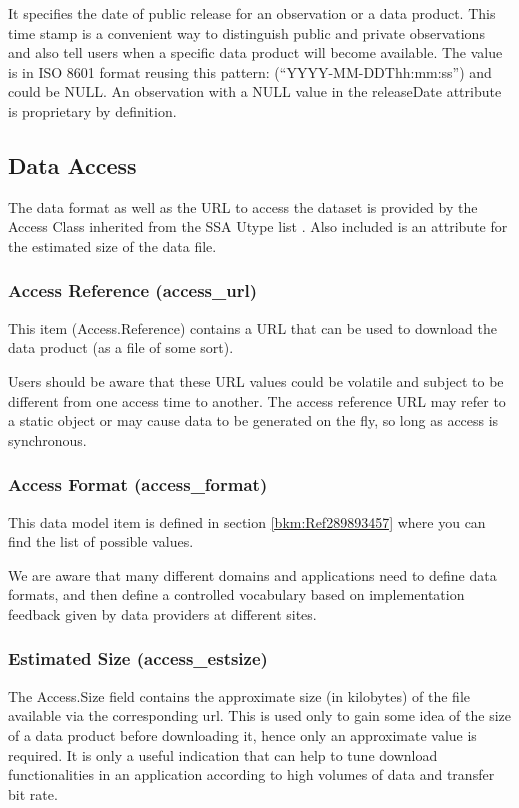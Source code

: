 \documentclass[11pt,a4paper]{ivoa}
\begin{document}
It specifies the date of public release for an observation or a data product. This time stamp is a convenient way to
distinguish public and private observations and also tell users when a specific data product will become available. The
value is in ISO 8601 format reusing this pattern: (``YYYY-MM-DDThh:mm:ss{}'') and could be NULL. An observation with a
NULL value in the releaseDate attribute is proprietary by definition.

\subsection{Data Access}
The data format as well as the URL to access the dataset is provided by the Access Class inherited from the SSA Utype
list \citep{2012ivoa.spec.0210T}. Also included is an attribute for the estimated size of the data file.

\subsubsection{Access Reference (access\_url)}
This item (Access.Reference) contains a URL that can be used to download the data product (as a file of some sort).

Users should be aware that these URL values could be volatile and subject to be different from one access time to
another.  The access reference URL may refer to a static object or may cause data to be generated on the fly, so long
as access is synchronous.

\subsubsection{Access Format (access\_format)}
\label{bkm:Ref297463580}This data model item is defined in section \ref{bkm:Ref289893457} where you can find the list of
possible values.

We are aware that many different domains and applications need to define data formats, and then define a controlled
vocabulary based on implementation feedback given by data providers at different sites.

\subsubsection{Estimated Size (access\_estsize)}
The Access.Size field contains the approximate size (in kilobytes) of the file available via the corresponding url.
This is used only to gain some idea of the size of a data product before downloading it, hence only an approximate
value is required. It is only a useful indication that can help to tune download functionalities in an application
according to high volumes of data and transfer bit rate.
\end{document}
